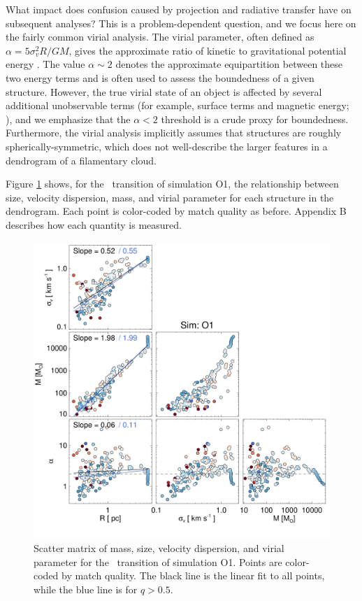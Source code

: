 What impact does confusion caused by projection and radiative transfer
have on subsequent analyses? This is a problem-dependent question,
and we focus here on the fairly common virial analysis. The virial
parameter, often defined as $\alpha= 5 \sigma_v^2 R / G M $, gives
the approximate ratio of kinetic to gravitational potential energy
\citep{http://adsabs.harvard.edu/abs/1992ApJ...399..551M}. The value
$\alpha \sim 2 $ denotes the approximate equipartition between these two
energy terms and is often used to assess the boundedness of a given
structure. However, the true virial state of an object is affected by
several additional unobservable terms (for example, surface terms and magnetic energy;
\citealt{http://adsabs.harvard.edu/abs/2006MNRAS.372..443B, http://adsabs.harvard.edu/abs/2007ApJ...661..262D, http://adsabs.harvard.edu/abs/1992ApJ...395..140B}), and we
emphasize that the $\alpha < 2$ threshold is a crude proxy for
boundedness. Furthermore, the virial analysis implicitly assumes that structures are roughly
spherically-symmetric, which does not well-describe the larger features in a dendrogram of a filamentary cloud.

Figure \ref{fig:scatter_matrix} shows, for the \coc\, transition of simulation O1, the relationship between size, velocity dispersion, mass, and
virial parameter for each structure in the dendrogram. Each point is color-coded by match quality as before.  Appendix B describes how each quantity is
measured.

\begin{figure}[htbp]
\includegraphics[width=6in]{figures/matrix_stella_13co}
\caption{Scatter matrix of mass, size, velocity dispersion, and virial parameter for the \coc\, transition of simulation O1.
Points are color-coded by match quality. The black line is the linear fit to all points, while the blue line is for $q > 0.5$.}
\label{fig:scatter_matrix}
\end{figure}

